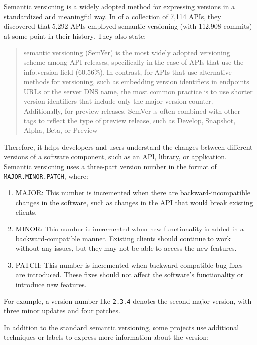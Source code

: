 \documentclass{article}
\begin{document}
Semantic versioning is a widely adopted method for expressing versions in a standardized and meaningful way. In \cite{xavierHistoricalImpactAnalysis2017} of a collection of 7,114 APIs, they discovered that 5,292 APIs employed semantic versioning (with 112,908 commits) at some point in their history. They also state:

\begin{quote}
    semantic versioning (SemVer) is the most widely adopted versioning scheme among API releases, specifically in the case of APIs that use the info.version field (60.56\%). In contrast, for APIs that use alternative methods for versioning, such as embedding version identifiers in endpoints URLs or the server DNS name, the most common practice is to use shorter version identifiers that include only the major version counter. Additionally, for preview releases, SemVer is often combined with other tags to reflect the type of preview release, such as Develop, Snapshot, Alpha, Beta, or Preview
\end{quote}

Therefore, it helps developers and users understand the changes between different versions of a software component, such as an API, library, or application. Semantic versioning uses a three-part version number in the format of \texttt{MAJOR.MINOR.PATCH}, where:

\begin{enumerate}
    \item MAJOR: This number is incremented when there are backward-incompatible changes in the software, such as changes in the API that would break existing clients.
    \item MINOR: This number is incremented when new functionality is added in a backward-compatible manner. Existing clients should continue to work without any issues, but they may not be able to access the new features.
    \item PATCH: This number is incremented when backward-compatible bug fixes are introduced. These fixes should not affect the software's functionality or introduce new features.
\end{enumerate}

For example, a version number like \texttt{2.3.4} denotes the second major version, with three minor updates and four patches.

In addition to the standard semantic versioning, some projects use additional techniques or labels to express more information about the version:
\end{document}

